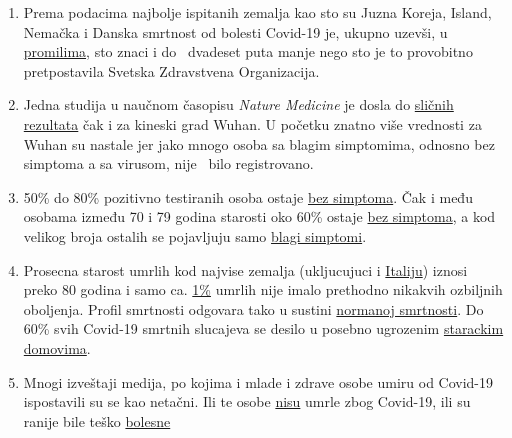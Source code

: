 \begin{enumerate}
\def\labelenumi{\arabic{enumi}.}
\tightlist
\item
  Prema podacima najbolje ispitanih zemalja kao sto su Juzna Koreja,
  Island, Nemačka i Danska smrtnost od bolesti Covid-19 je, ukupno
  uzevši, u
  \href{https://swprs.org/studies-on-covid-19-lethality/}{promilima},
  sto znaci i do ~dvadeset puta manje nego sto je to provobitno
  pretpostavila Svetska Zdravstvena Organizacija.
\item
  Jedna studija u naučnom časopisu \emph{Nature Medicine} je dosla do
  \href{https://www.nature.com/articles/s41591-020-0822-7}{sličnih
  rezultata} čak i za kineski grad Wuhan. U početku znatno više
  vrednosti za Wuhan su nastale jer jako mnogo osoba sa blagim
  simptomima, odnosno bez simptoma a sa virusom, nije~ bilo
  registrovano.
\item
  50\% do 80\% pozitivno testiranih osoba ostaje
  \href{https://www.bmj.com/content/369/bmj.m1375}{bez simptoma}. Čak i
  među osobama između 70 i 79 godina starosti oko 60\% ostaje
  \href{https://www.niid.go.jp/niid/en/2019-ncov-e/9407-covid-dp-fe-01.html}{bez
  simptoma}, a kod velikog broja ostalih se pojavljuju samo
  \href{https://swprs.org/studies-on-covid-19-lethality/\#hospitalizations}{blagi
  simptomi}.
\item
  Prosecna starost umrlih kod najvise zemalja (ukljucujuci i
  \href{https://www.epicentro.iss.it/coronavirus/sars-cov-2-decessi-italia}{Italiju})
  iznosi preko 80 godina i samo ca.
  \href{https://www.bloomberg.com/news/articles/2020-03-18/99-of-those-who-died-from-virus-had-other-illness-italy-says}{1\%}
  umrlih nije imalo prethodno nikakvih ozbiljnih oboljenja. Profil
  smrtnosti odgovara tako u sustini
  \href{https://www.vienna.at/analyse-zeigt-covid-19-opferkurve-entspricht-normaler-mortalitaet/6581246}{normanoj
  smrtnosti}. Do 60\% svih Covid-19 smrtnih slucajeva se desilo u
  posebno ugrozenim
  \href{https://ltccovid.org/2020/04/12/mortality-associated-with-covid-19-outbreaks-in-care-homes-early-international-evidence/}{starackim
  domovima}.
\item
  Mnogi izveštaji medija, po kojima i mlade i zdrave osobe umiru od
  Covid-19 ispostavili su se kao netačni. Ili te osobe
  \href{https://archive.is/20200329015127/https:/www.theguardian.com/world/2020/mar/27/chloe-middleton-death-21-year-old-not-recorded-nhs-covid-19-related}{nisu}
  umrle zbog Covid-19, ili su ranije bile teško
  \href{https://www.msn.com/de-ch/news/other/spanischer-nachwuchs-trainer-stirbt-an-corona/ar-BB11gT64}{bolesne}

\end{enumerate}
